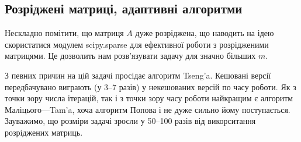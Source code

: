 \newpage\subsection{Розріджені матриці, адаптивні алгоритми}

Нескладно помітити, що матриця $A$ дуже розріджена, що наводить на ідею скористатися модулем scipy.sparse для ефективної роботи з розрідженими матрицями. Це дозволить нам розв'язувати задачу для значно більших $m$.



З певних причин на цій задачі просідає алгоритм Tseng'a. Кешовані версії передбачувано виграють (у 3--7 разів) у некешованих версій по часу роботи. Як з точки зору числа ітерацій, так і з точки зору часу роботи найкращим є алгоритм Маліцього---Tam'a, хоча алгоритм Попова і не дуже сильно йому поступається. Зауважимо, що розміри задачі зросли у 50--100 разів від викорситання розріджених матриць.

